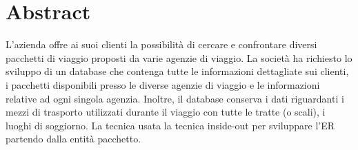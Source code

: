 \section{Abstract}
L'azienda \company offre ai suoi clienti la possibilità di cercare e confrontare diversi pacchetti di viaggio proposti da varie agenzie di viaggio. La società ha richiesto lo sviluppo di un database che contenga tutte le informazioni dettagliate sui clienti, i pacchetti disponibili presso le diverse agenzie di viaggio e le informazioni relative ad ogni singola agenzia. Inoltre, il database conserva i dati riguardanti i mezzi di trasporto utilizzati durante il viaggio con tutte le tratte (o scali), i luoghi di soggiorno.
La tecnica usata la tecnica inside-out per sviluppare l'ER partendo dalla entità pacchetto.